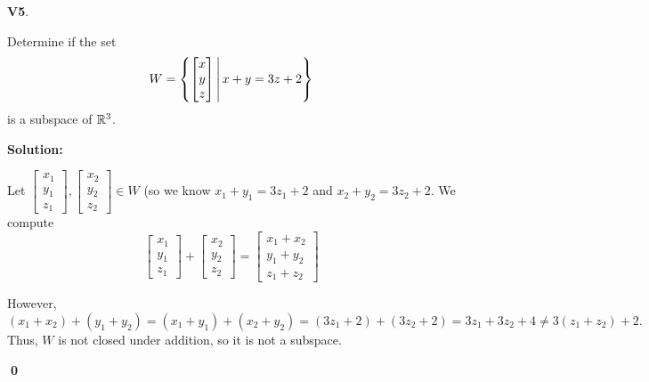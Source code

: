 \documentclass{article}
\newenvironment{problem}[1]
{
	\begin{flushleft}
	\textbf{#1}.
	\ignorespaces
}
{
	\end{flushleft}
}
\newenvironment{solution}
{
	\ignorespaces
	\textbf{Solution:}
}
{
	\ignorespacesafterend
	\begin{flushright}
	{\bfseries \qed}
	\end{flushright}
}
\begin{document}
\begin{problem}{V5}
Determine if the set \[W = \left\{\begin{bmatrix} x \\ y \\ z \end{bmatrix}\,\middle|\, x+y=3z+2\right\}\]
is a subspace of \(\mathbb{R}^3\).
\end{problem}
\begin{solution}
Let \(\begin{bmatrix} x_1 \\y_1 \\ z_1 \end{bmatrix}, \begin{bmatrix} x_2 \\y_2 \\ z_2 \end{bmatrix} \in W\) (so we know \(x_1+y_1=3z_1+2\) and \(x_2+y_2=3z_2+2\).  We compute 
\[  
\begin{bmatrix} x_1 \\y_1 \\ z_1 \end{bmatrix} 
+\begin{bmatrix} x_2 \\y_2 \\ z_2 \end{bmatrix}
=\begin{bmatrix} x_1+x_2 \\y_1+y_2 \\ z_1+z_2 \end{bmatrix}
\]

However, \[ (x_1+x_2)+(y_1+y_2) = (x_1+y_1)+(x_2+y_2) = (3z_1+2)+(3z_2+2)=3z_1+3z_2+4 \neq 3(z_1+z_2)+2.\]
Thus, \(W\) is not closed under addition, so it is not a subspace.
\end{solution}
\end{document}
